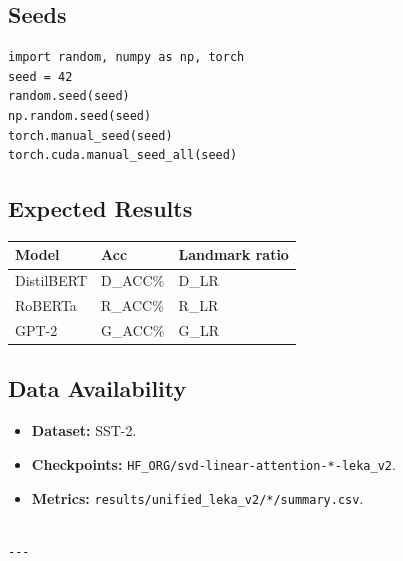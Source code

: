 \subsection{Seeds}

\begin{lstlisting}
import random, numpy as np, torch
seed = 42
random.seed(seed)
np.random.seed(seed)
torch.manual_seed(seed)
torch.cuda.manual_seed_all(seed)
\end{lstlisting}

\subsection{Expected Results}

\begin{table}[H]
\centering
\small
\begin{tabular}{lll}
\toprule
\textbf{Model} & \textbf{Acc} & \textbf{Landmark ratio} \\
\midrule
DistilBERT & {{D\_ACC}}\% & {{D\_LR}} \\
RoBERTa & {{R\_ACC}}\% & {{R\_LR}} \\
GPT-2 & {{G\_ACC}}\% & {{G\_LR}} \\
\bottomrule
\end{tabular}
\end{table}

\subsection{Data Availability}

\begin{itemize}
\item \textbf{Dataset:} SST-2.
\item \textbf{Checkpoints:} \texttt{{{HF\_ORG}}/svd-linear-attention-*-leka\_v2}.
\item \textbf{Metrics:} \texttt{results/unified\_leka\_v2/*/summary.csv}.
\end{itemize}
\begin{lstlisting}

---
\end{lstlisting}